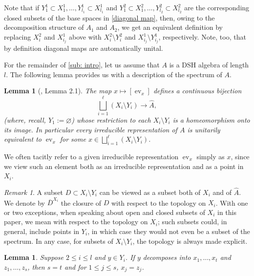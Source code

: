 \documentclass[12pt]{amsart}
\numberwithin{equation}{section}
\newtheorem{lemma}[theorem]{Lemma}
\theoremstyle{definition}
\theoremstyle{remark}
\newtheorem{remark}[theorem]{Remark}
\newcommand{\ev}{\operatorname{ev}}
\newcommand{\spec}{\bigsqcup_{i=1}^{\ell}(X_{i}\setminus Y_{i})}
\begin{document}
Note that if $Y_{1}^{1}\subset X_{1}^{1},\ldots ,Y_{ l_{1}}^{1}\subset X_{ l_{1}}^{1}$ and $Y_{1}^{2}\subset X_{1}^{2},\ldots ,Y_{ l_{2}}^{2}\subset X_{ l_{2}}^{2}$ are the corresponding closed subsets of the base spaces in \autoref{diagonal map}, then, owing to the decomposition structure of $A_{1}$ and $A_{2}$, we get an equivalent definition by replacing $X_{i}^{2}$ and $X_{i_{j}}^{1}$ above with $X_{i}^{2}\setminus Y_{i}^{2}$ and $X_{i_{j}}^{1}\setminus Y_{i_{j}}^{1}$, respectively. Note, too, that by definition diagonal maps are automatically unital.

For the remainder of \cref{sub: intro}, let us assume that $A$ is a DSH algebra of length $ l$. The following lemma provides us with a description of the spectrum of $A$.

\begin{lemma}[\cite{phil}, Lemma 2.1]
	\label{DSH spectrum}
	The map $x\mapsto [\ev_{x}]$ defines a continuous bijection
	$$
	\spec\to \hat{A},
	$$
	(where, recall,  $Y_{1}:=\varnothing$) whose restriction to each $X_{i}\setminus Y_{i}$ is a homeomorphism onto its image. In particular every irreducible representation of $A$ is unitarily equivalent to $\ev_{x}$ for some $x\in \spec$.
\end{lemma}


We often tacitly refer to a given irreducible representation $\ev_{x}$ simply as $x$, since we view such an element both as an irreducible representation and as a point in $X_{i}$. 

\begin{remark}
	A subset $D\subset X_{i}\setminus Y_{i}$ can be viewed as a subset both of $X_{i}$ and of $\hat{A}$. We denote by $\overline{D}^{X_{i}}$ the closure of $D$ with respect to the topology on $X_{i}$. With one or two exceptions, when speaking about open and closed subsets of $X_{i}$ in this paper, we mean with respect to the topology on $X_{i}$; such subsets could, in general, include points in $Y_{i}$, in which case they would not even be a subset of the spectrum. In any case, for subsets of $X_{i}\setminus Y_{i}$, the topology is always made explicit.
\end{remark}

\begin{lemma}
	\label{unique}
	Suppose $2\leq i\leq  l$ and $y\in Y_{i}$. If $y$ decomposes into $x_{1},\ldots,x_{t}$ and $z_{1},\ldots,z_{s}$, then $s=t$ and for $1\leq j\leq s$, $x_{j}=z_{j}$.   
\end{lemma}
\end{document}
